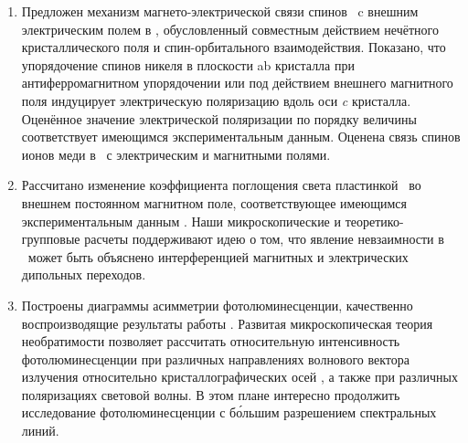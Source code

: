 \begin{enumerate}
  \item Предложен механизм магнето-электрической связи спинов \niIon\ c внешним электрическим полем в \ncbo, обусловленный совместным действием нечётного кристаллического поля и спин-орбитального взаимодействия. Показано, что упорядочение спинов никеля в плоскости ab кристалла при антиферромагнитном упорядочении или под действием внешнего магнитного поля индуцирует электрическую поляризацию вдоль оси \textit{c} кристалла. Оценённое значение электрической поляризации по порядку величины соответствует имеющимся экспериментальным данным. Оценена связь спинов ионов меди в \cbo\ с электрическим и магнитными полями.
  \item Рассчитано изменение коэффициента поглощения света пластинкой \cbo\ во внешнем постоянном магнитном поле, соответствующее имеющимся экспериментальным данным \cite{Toyoda2015}. Наши микроскопические и теоретико-групповые расчеты поддерживают идею о том, что явление невзаимности в \cbo\ может быть объяснено интерференцией магнитных и электрических дипольных переходов.
  \item Построены диаграммы асимметрии фотолюминесценции, качественно воспроизводящие результаты работы \cite{Toyoda2016}. Развитая микроскопическая теория необратимости  позволяет рассчитать относительную интенсивность фотолюминесценции при различных направлениях волнового вектора излучения относительно кристаллографических осей \cbo, а также при различных поляризациях световой волны. В этом плане интересно продолжить исследование фотолюминесценции с б\'{о}льшим разрешением спектральных линий.

\end{enumerate}

